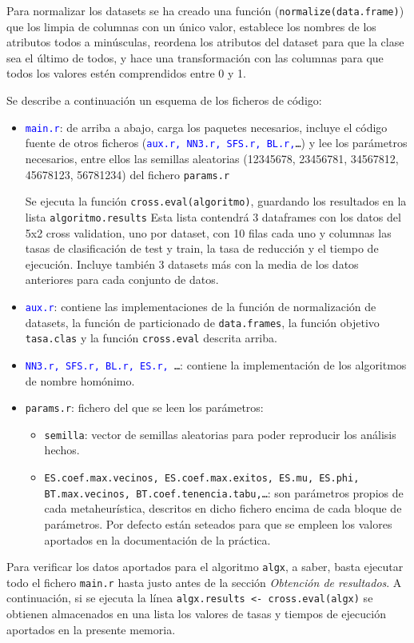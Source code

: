 \documentclass[a4paper,11pt]{article}
\newcommand{\blue}[1]{\textcolor{blue}{#1}}
\begin{document}
Para normalizar los datasets se ha creado una función (\texttt{normalize(data.frame)}) que los limpia de columnas con
un único valor, establece los nombres de los atributos todos a minúsculas, reordena los atributos del dataset para que
la clase sea el último de todos, y hace una transformación con las columnas para que todos los valores estén comprendidos
entre 0 y 1.

Se describe a continuación un esquema de los ficheros de código:
\begin{itemize}
 \item \texttt{\blue{main.r}}: de arriba a abajo, carga los paquetes necesarios, incluye el código fuente de otros ficheros
  (\texttt{\blue{aux.r, NN3.r, SFS.r, BL.r,}\ldots}) y lee los parámetros necesarios, entre ellos las semillas aleatorias
  (12345678, 23456781, 34567812, 45678123, 56781234) del fichero \texttt{params.r}
  
  Se ejecuta la función \texttt{cross.eval(algoritmo)}, guardando los resultados en la lista \texttt{algoritmo.results}
  Esta lista contendrá 3 dataframes con los datos del 5x2 cross validation, uno por dataset, con 10 filas cada uno 
  y columnas las tasas de clasificación de test y train, la tasa de reducción y el tiempo de ejecución. 
  Incluye también 3 datasets más con la media de los datos anteriores para cada conjunto de datos.
 
 \item \texttt{\blue{aux.r}}: contiene las implementaciones de la función de normalización de datasets, la función de
 particionado de \texttt{data.frames}, la función objetivo \texttt{tasa.clas} y la función \texttt{cross.eval}
 descrita arriba.
 
 \item \texttt{\blue{NN3.r, SFS.r, BL.r, ES.r, }\ldots}: contiene la implementación de los algoritmos de nombre 
 homónimo.
 
 \item \texttt{params.r}: fichero del que se leen los parámetros:
  \begin{itemize}
    \item \texttt{semilla}: vector de semillas aleatorias para poder reproducir los análisis hechos.
    \item \texttt{ES.coef.max.vecinos, ES.coef.max.exitos, ES.mu, ES.phi, \\BT.max.vecinos, BT.coef.tenencia.tabu,\ldots}:
    son parámetros propios de cada metaheurística, descritos en dicho fichero encima de cada bloque de parámetros.
    Por defecto están seteados para que se empleen los valores aportados en la documentación de la práctica.
  \end{itemize}
 \end{itemize}
 
 Para verificar los datos aportados para el algoritmo \texttt{algx}, a saber, basta ejecutar todo el fichero \texttt{main.r}
 hasta justo antes de la sección \textit{Obtención de resultados}. A continuación, si se ejecuta la línea 
 \texttt{algx.results <- cross.eval(algx)} se obtienen almacenados en una lista los valores de tasas y tiempos de ejecución
 aportados en la presente memoria.
\end{document}
